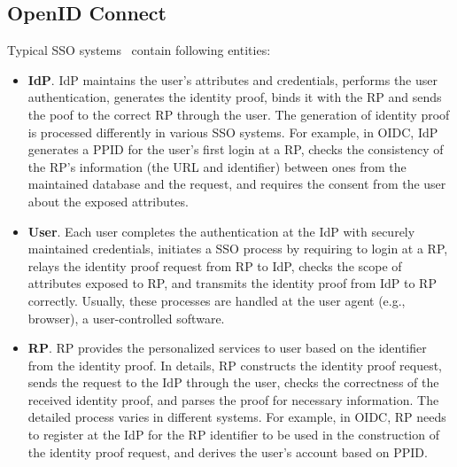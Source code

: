 \subsection{OpenID Connect}
\label{subsec:OIDC}
Typical SSO systems~\cite{SAMLIdentifier,OpenIDConnect,SPRESSO} contain following entities:
\begin{itemize}
    \item \textbf{IdP}. IdP maintains the user's attributes and credentials, performs the user authentication, generates the identity proof, binds it with the RP 
    and sends the poof  to the correct RP through the user.
    The generation of identity proof is processed differently in various SSO systems.
    For example, in OIDC, IdP generates a PPID for the user's first login at a RP,
    checks the consistency of the RP's information (the URL and identifier) between ones from the maintained database and the request,
    and requires the  consent from the user about the exposed attributes.
    
     \item \textbf{User}. Each user completes the authentication at the IdP with securely maintained credentials,
     initiates a SSO process by requiring to login at a RP,
     relays the identity proof request from RP to IdP,
     checks the scope of attributes exposed to RP,
     and transmits the identity proof from IdP to RP correctly.
     Usually, these processes are handled at the user agent (e.g., browser),  a user-controlled software. %
     
    \item \textbf{RP}. RP provides the personalized services to user based on the identifier from the identity proof. 
    In details, RP constructs the identity proof request, sends the request to the IdP through the user, checks the correctness of the received identity proof, 
    and parses the proof for necessary information.
    The detailed process varies in different systems.
     For example, in OIDC, RP needs to register at the IdP for the RP identifier to be used in the construction of the identity proof request, 
     and derives the user's account based on PPID.
\end{itemize}
